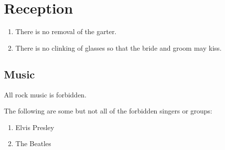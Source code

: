\documentclass{article}
\begin{document}
\section{Reception}

\begin{enumerate}
    \item There is no removal of the garter. 
    \item There is no clinking of glasses so that the bride and groom may kiss.
\end{enumerate}

\subsection{Music}

All rock music is forbidden. 


The following are some but not all of the forbidden singers or groups:

\begin{enumerate}
    \item Elvis Presley
    \item The Beatles
\end{enumerate}
\end{document}
